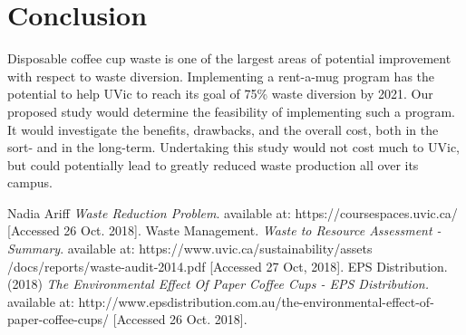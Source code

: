 \documentclass[letterpaper,11pt]{texMemo}
\begin{document}
\section*{Conclusion}
Disposable coffee cup waste is one of the largest areas of potential
improvement with respect to waste diversion.  Implementing a rent-a-mug
program has the potential to help UVic to reach its goal of 75\% waste diversion
by 2021.
\newline
\newline
Our proposed study would determine the feasibility of implementing such a
program. It would investigate the benefits, drawbacks, and the overall cost,
both in the sort- and in the long-term. Undertaking this study would not cost
much to UVic, but could potentially lead to greatly reduced waste production
all over its campus.

\begin{thebibliography}{9}
	Nadia Ariff
	\textit{Waste Reduction Problem}.
	available at: https://coursespaces.uvic.ca/
	[Accessed 26 Oct. 2018].
	Waste Management.
	\textit{Waste to Resource Assessment \-- Summary}.
	available at: https://www.uvic.ca/sustainability/assets
		/docs/reports/waste-audit-2014.pdf
	[Accessed 27 Oct, 2018].
	EPS Distribution. (2018)
	\textit{The Environmental Effect Of Paper Coffee Cups \-- EPS Distribution.}
	available at:
	http://www.epsdistribution.com.au/the-environmental-effect-of-paper-coffee-cups/
	[Accessed 26 Oct. 2018].

\end{thebibliography}
\end{document}
